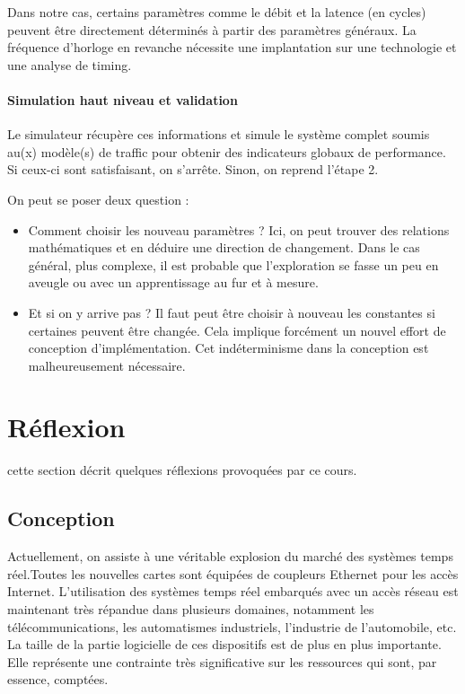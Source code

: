 \documentclass[11pt]{article}
\begin{document}
Dans notre cas, certains paramètres comme le débit et la latence (en cycles) peuvent être directement déterminés à partir des paramètres généraux. La fréquence d'horloge en revanche nécessite une implantation sur une technologie et une analyse de timing.

\paragraph{Simulation haut niveau et validation}
Le simulateur récupère ces informations et simule le système complet soumis au(x) modèle(s) de traffic pour obtenir des indicateurs globaux de performance. Si ceux-ci sont satisfaisant, on s'arrête. Sinon, on reprend l'étape 2.

On peut se poser deux question :
\begin{itemize}
\item Comment choisir les nouveau paramètres ? Ici, on peut trouver des relations mathématiques et en déduire une direction de changement. Dans le cas général, plus complexe, il est probable que l'exploration se fasse un peu en aveugle ou avec un apprentissage au fur et à mesure.
\item Et si on y arrive pas ? Il faut peut être choisir à nouveau les constantes si certaines peuvent être changée. Cela implique forcément un nouvel effort de conception d'implémentation. Cet indéterminisme dans la conception est malheureusement nécessaire.
\end{itemize}

\section{Réflexion}

cette section décrit quelques réflexions provoquées par ce cours.

\subsection{Conception}

Actuellement, on assiste à une véritable explosion du marché des systèmes temps réel.Toutes les nouvelles cartes sont équipées de coupleurs Ethernet pour les accès Internet. L'utilisation des systèmes temps réel embarqués avec un accès réseau est maintenant très répandue dans plusieurs domaines, notamment les télécommunications, les automatismes industriels, l'industrie de l’automobile, etc. La taille de la partie logicielle de ces dispositifs est de plus en plus importante. Elle représente une contrainte très significative sur les ressources qui sont, par essence, comptées.
\end{document}
